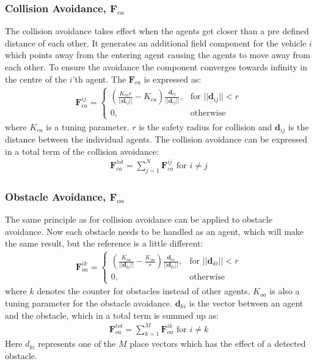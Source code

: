 \documentclass[a4paper,conference]{IEEEtran}
\begin{document}
\subsubsection{Collision Avoidance, $\mathbf{F}_{ca}$}
The collision avoidance takes effect when the agents get closer than a
pre defined distance of each other. It generates an additional field
component for the vehicle $i$ which points away from the entering
agent causing the agents to move away from each other. To ensure the
avoidance the component converges towards infinity in the centre of
the $i$'th agent. The $\mathbf{F}_{ca}$ is expressed as:
\begin{align}
    \mathbf{F}_{ca}^{ij}= 
\begin{cases}
		\left(
    \frac{K_{ca}r}{||\mathbf{d}_{ij}||}-K_{ca}
		\right)
		\frac{\mathbf{d}_{ij}}{||\mathbf{d}_{ij}||}
		,& \text{for } ||\mathbf{d}_{ij}||<r\\
    0,              & \text{otherwise}
\end{cases}
\end{align}
where $K_{ca}$ is a tuning parameter. $r$ is the safety radius for
collision and $\mathbf{d}_{ij}$ is the distance between the individual agents.
The collision avoidance can be expressed in a total term of the
collision avoidance:
\begin{align}
\mathbf{F}_{ca}^{tot} = \sum\limits_{j=1}^N\mathbf{F}_{ca}^{ij} \text{ for } i\neq j
\end{align}

\subsubsection{Obstacle Avoidance, $\mathbf{F}_{oa}$}
The same principle as for collision avoidance can be applied to
obstacle avoidance. Now each obstacle needs to be handled as an agent,
which will make the same result, but the reference is a little
different:
\begin{align}
    \mathbf{F}_{oa}^{ik}= 
\begin{cases}
    \left( \frac{K_{oa}}{||\mathbf{d}_{ki}||}-\frac{K_{oa}}{r}\right)
		\frac{\mathbf{d}_{{ki}}}{||\mathbf{d}_{ki}||},& \text{for } ||\mathbf{d}_{ki}||<r\\
    0,              & \text{otherwise}
\end{cases}
\end{align}
where $k$ denotes the counter for obstacles instead of other agents.
$K_{oa}$ is also a tuning parameter for the obstacle avoidance.
$\mathbf{d}_{ki}$ is the vector between an agent and the obstacle, which in a
total term is summed up as:
\begin{align}
\mathbf{F}_{oa}^{tot} = \sum\limits_{k=1}^M\mathbf{F}_{oa}^{ik} \text{ for } i\neq k
\end{align}
Here $d_{ki}$ represents one of the $M$ place vectors which has the
effect of a detected obstacle.
\end{document}

